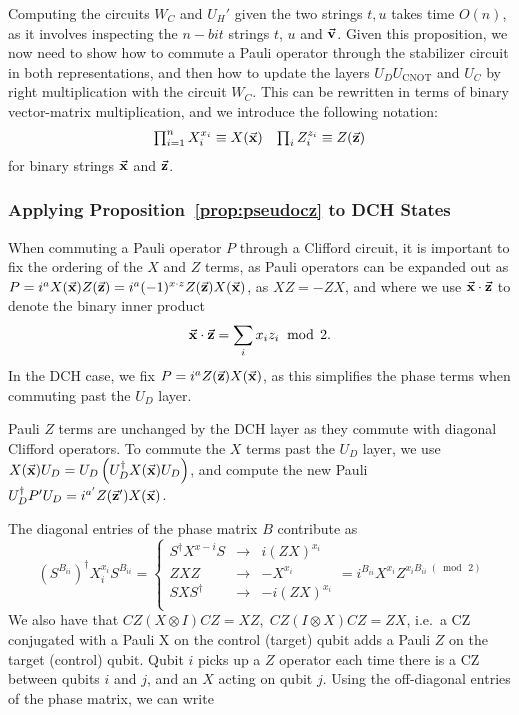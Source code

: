 Computing the circuits $W_{C}$ and $U_{H}'$ given the two strings $t,u$ takes time $O(n)$, as it involves inspecting the $n-bit$ strings $t$, $u$ and $\va{v}$. Given this proposition, we now need to show how to commute a Pauli operator through the stabilizer circuit in both representations, and then how to update the layers $U_{D}U_{\text{CNOT}}$ and $U_{C}$ by right multiplication with the circuit $W_{C}$. This can be rewritten in terms of binary vector-matrix multiplication, and we introduce the following notation:
\[
\begin{array}{lr}
\prod_{i=1}^{n}X_{i}^{x_{i}} \equiv X(\va{x}) & \prod_{i}Z_{i}^{z_{i}} \equiv Z(\va{z})
\end{array}
\]
for binary strings $\va{x}$ and $\va{z}$.
\subsubsection*{Applying Proposition~\ref{prop:pseudocz} to DCH States}
When commuting a Pauli operator $P$ through a Clifford circuit, it is important to fix the ordering of the $X$ and $Z$ terms, as Pauli operators can be expanded out as $P=i^{a}X(\va{x})Z(\va{z}) = i^{a}(-1)^{x\cdot z}Z(\va{z})X(\va{x})$, as $XZ=-ZX$, and where we use $\va{x}\cdot \va{z}$ to denote the binary inner product
\[\va{x}\cdot \va{z} = \sum_{i}x_{i}z_{i}\;\bmod\,2.\]
In the DCH case, we fix $P=i^{a}Z(\va{z})X(\va{x})$, as this simplifies the phase terms when commuting past the $U_{D}$ layer.\par
Pauli $Z$ terms are unchanged by the DCH layer as they commute with diagonal Clifford operators. To commute the $X$ terms past the $U_{D}$ layer, we use $X(\va{x})U_{D} = U_{D}\left(U_{D}^{\dagger}X(\va{x})U_{D}\right)$, and compute the new Pauli $U_{D}^{\dagger}P'U_{D}=i^{a'}Z(\va{z}')X(\va{x})$.\par
The diagonal entries of the phase matrix $B$ contribute as
\[(S^{B_{ii}})^{\dagger} X_{i}^{x_{i}} S^{B_{ii}} = \left\{
\begin{array}{rcl}
S^{\dagger}X^{x-{i}} S & \rightarrow & i(ZX)^{x_{i}} \\
ZXZ & \rightarrow & -X^{x_{i}}\\
SXS^{\dagger} & \rightarrow & -i (ZX)^{x_{i}}\\
\end{array} = i^{B_{ii}}X^{x_{i}}Z^{x_{i}B_{ii}\;(\bmod\,2)}
\right.\]
We also have that $CZ (X\otimes I) CZ = XZ,\;CZ(I\otimes X)CZ=ZX$, i.e.~a CZ conjugated with a Pauli X on the control (target) qubit adds a Pauli $Z$ on the target (control) qubit. Qubit $i$ picks up a $Z$ operator each time there is a CZ between qubits $i$ and $j$, and an $X$ acting on qubit $j$. Using the off-diagonal entries of the phase matrix, we can write
